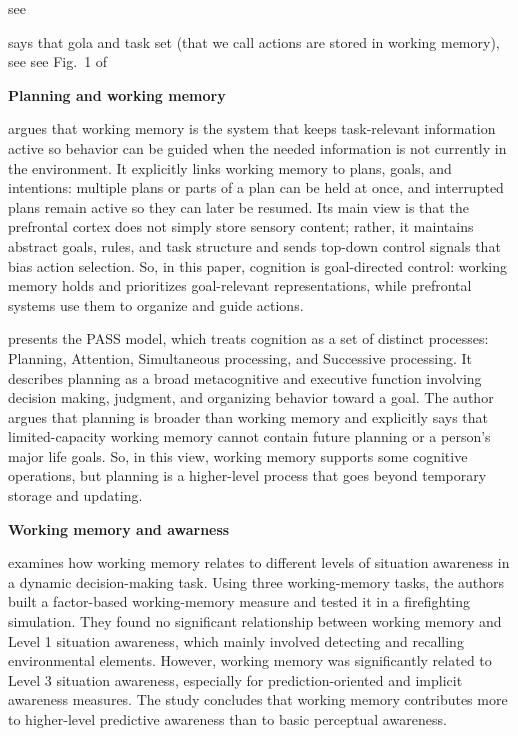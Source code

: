 \documentclass{book}
\providecommand{\ProjectDeepHeading}[2]{%
    \par\medskip\noindent\textbf{#2}\par\smallskip
}
\begin{document}
        
        see \cite{cowan-2017-the-many-faces-of-working-memory}
        
        \cite{eriksson-2015-neurocognitive-architecture-of-working-memory} says that gola and task set (that we call actions are stored in working memory), see see Fig.~1 of \cite{eriksson-2015-neurocognitive-architecture-of-working-memory}
    
    
    \ProjectDeepHeading{8}{Planning and working memory}
        
        \cite{desposito-2015-the-cognitive-neuroscience-of-working-memory} argues that working memory is the system that keeps task-relevant information active so behavior can be guided when the needed information is not currently in the environment. It explicitly links working memory to plans, goals, and intentions: multiple plans or parts of a plan can be held at once, and interrupted plans remain active so they can later be resumed. Its main view is that the prefrontal cortex does not simply store sensory content; rather, it maintains abstract goals, rules, and task structure and sends top-down control signals that bias action selection. So, in this paper, cognition is goal-directed control: working memory holds and prioritizes goal-relevant representations, while prefrontal systems use them to organize and guide actions.
        
        \cite{das-2015-three-faces-of-cognitive-processes-theory-assessment-and-intervention}  presents the PASS model, which treats cognition as a set of distinct processes: Planning, Attention, Simultaneous processing, and Successive processing. It describes planning as a broad metacognitive and executive function involving decision making, judgment, and organizing behavior toward a goal. The author argues that planning is broader than working memory and explicitly says that limited-capacity working memory cannot contain future planning or a person’s major life goals.
        So, in this view, working memory supports some cognitive operations, but planning is a higher-level process that goes beyond temporary storage and updating.
    
    
    \ProjectDeepHeading{8}{Working memory and awarness}
        \cite{gutzwiller-2013-the-role-of-working-memory-in-levels-of-situation-awareness} examines how working memory relates to different levels of situation awareness in a dynamic decision-making task. Using three working-memory tasks, the authors built a factor-based working-memory measure and tested it in a firefighting simulation. They found no significant relationship between working memory and Level 1 situation awareness, which mainly involved detecting and recalling environmental elements. However, working memory was significantly related to Level 3 situation awareness, especially for prediction-oriented and implicit awareness measures. The study concludes that working memory contributes more to higher-level predictive awareness than to basic perceptual awareness.
    
\end{document}

